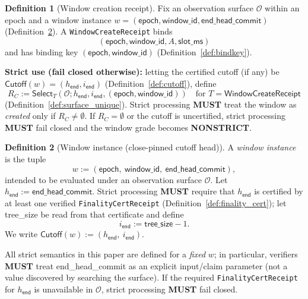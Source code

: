 \documentclass[11pt]{article}
\newcommand{\MUST}{\textbf{MUST}}
\newcommand{\code}[1]{\texttt{#1}}
\newcommand{\term}[1]{\emph{#1}}
\newcommand{\1}{\mathbf{1}}
\theoremstyle{definition}
\newtheorem{definition}{Definition}
\theoremstyle{plain}
\begin{document}
\begin{definition}[Window creation receipt]
\label{def:window_create}
Fix an observation surface $\mathcal{O}$ within an epoch and a window instance $w=(\textsf{epoch},\textsf{window\_id},\textsf{end\_head\_commit})$ (Definition~\ref{def:window_instance}).
A \code{WindowCreateReceipt} binds
\[
(\textsf{epoch},\textsf{window\_id},A,\textsf{slot\_ms})
\]
and has binding key $(\textsf{epoch},\textsf{window\_id})$ (Definition~\ref{def:bindkey}).

\textbf{Strict use (fail closed otherwise):}
letting the certified cutoff (if any) be $\textsf{Cutoff}(w)=(h_{\textsf{end}},i_{\textsf{end}})$ (Definition~\ref{def:cutoff}),
define
\[
R_C := \mathsf{Select}_T(\mathcal{O};h_{\textsf{end}},i_{\textsf{end}},(\textsf{epoch},\textsf{window\_id}))\quad\text{for }T=\textsf{WindowCreateReceipt}
\]
(Definition~\ref{def:surface_unique}).
Strict processing \MUST{} treat the window as \term{created} only if $R_C\neq\emptyset$.
If $R_C=\emptyset$ or the cutoff is uncertified, strict processing \MUST{} fail closed and the window grade becomes \textbf{NONSTRICT}.
\end{definition}



\begin{definition}[Window instance (close-pinned cutoff head)]
\label{def:window_instance}
A \term{window instance} is the tuple
\[
w := (\textsf{epoch},\ \textsf{window\_id},\ \textsf{end\_head\_commit}),
\]
intended to be evaluated under an observation surface $\mathcal{O}$.
Let $h_{\textsf{end}}:=\textsf{end\_head\_commit}$.
Strict processing \MUST{} require that $h_{\textsf{end}}$ is certified by at least one verified \code{FinalityCertReceipt} (Definition~\ref{def:finality_cert});
let \textsf{tree\_size} be read from that certificate and define
\[
i_{\textsf{end}} := \textsf{tree\_size}-1.
\]
We write $\textsf{Cutoff}(w):=(h_{\textsf{end}},\ i_{\textsf{end}})$.

All strict semantics in this paper are defined for a \emph{fixed} $w$; in particular, verifiers \MUST{} treat \textsf{end\_head\_commit} as an explicit input/claim parameter (not a value discovered by searching the surface).
If the required \code{FinalityCertReceipt} for $h_{\textsf{end}}$ is unavailable in $\mathcal{O}$, strict processing \MUST{} fail closed.
\end{definition}
\end{document}
